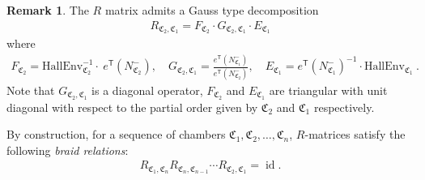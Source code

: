 \documentclass[10pt]{amsart}
\theoremstyle{definition}
\newtheorem{Remark}[Theorem]{Remark}
\numberwithin{equation}{section}
\newcommand{\HallEnv}{\mathrm{HallEnv}}
\newcommand{\fC}{\mathfrak{C}}
\newcommand{\sT}{\mathsf{T}}
\newcommand{\id}{\operatorname{id}}
\begin{document}
\begin{Remark}
The $R$ matrix admits a Gauss type decomposition 
\begin{align}\label{gauss decomp_general}
    R_{\fC_2,\fC_1}=F_{\fC_2}\cdot G_{\fC_2,\fC_1}\cdot E_{\fC_1}
\end{align}
where 
\begin{align*}
    F_{\fC_2}=\HallEnv_{\fC_2}^{-1}\cdot \: e^{\sT}(N^-_{\fC_2}),\quad G_{\fC_2,\fC_1}=\frac{e^{\sT}(N^-_{\fC_1})}{e^{\sT}(N^-_{\fC_2})},\quad E_{\fC_1}=e^{\sT}(N^-_{\fC_1})^{-1}\cdot \HallEnv_{\fC_1}\:.
\end{align*}
Note that $G_{\fC_2,\fC_1}$ is a diagonal operator, $F_{\fC_2}$ and $E_{\fC_1}$ are triangular with unit diagonal with respect to the partial order given by $\fC_2$ and $\fC_1$ respectively.
\end{Remark}

By construction, for a sequence of chambers $\fC_1,\fC_2,\ldots,\fC_n$, $R$-matrices satisfy the following \textit{braid relations}:
\begin{align}\label{braid}
    R_{\fC_1,\fC_n} R_{\fC_n,\fC_{n-1}}\cdots R_{\fC_2,\fC_1}=\id.
\end{align}
\end{document}
